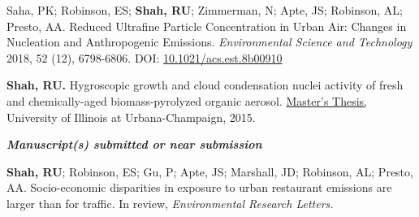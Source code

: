 \documentclass{article}
\begin{document}
\begin{etaremune}
\item Saha, PK; Robinson, ES; \textbf{Shah, RU}; Zimmerman, N; Apte, JS; Robinson, AL; Presto, AA. Reduced Ultrafine Particle Concentration in Urban Air: Changes in Nucleation and Anthropogenic Emissions. \textit{Environmental Science and Technology} 2018, 52 (12), 6798-6806. DOI: \href{http://pubs.acs.org/doi/10.1021/acs.est.8b00910}{10.1021/acs.est.8b00910}
\item \textbf{Shah, RU.} Hygroscopic growth and cloud condensation nuclei activity of fresh and chemically-aged biomass-pyrolyzed organic aerosol. \href{https://www.ideals.illinois.edu/handle/2142/88130}{Master's Thesis,} University of Illinois at Urbana-Champaign, 2015.
\end{etaremune}

\hrulefill
\textit{\textbf{  Manuscript(s) submitted or near submission  }}
\hrulefill
\begin{etaremune}
\item \textbf{Shah, RU}; Robinson, ES; Gu, P; Apte, JS; Marshall, JD; Robinson, AL; Presto, AA. Socio-economic disparities in exposure to urban restaurant emissions are larger than for traffic. In review, \textit{Environmental Research Letters.}
\end{etaremune}
\end{document}
